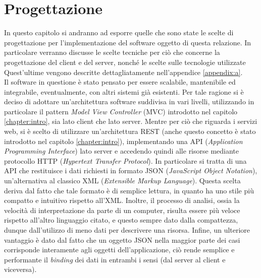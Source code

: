 \chapter{Progettazione} \label{chapter:prog}
In questo capitolo si andranno ad esporre quelle che sono state le scelte di progettazione per l'implementazione del software oggetto di questa relazione. In particolare verranno discusse le scelte tecniche per ciò che concerne la progettazione del client e del server, nonché le scelte sulle tecnologie utilizzate
Quest'ultime vengono descritte dettagliatamente nell'appendice \ref{appendix:a}.\\

Il software in questione è stato pensato per essere scalabile, mantenibile ed integrabile, eventualmente, con altri sistemi già esistenti. Per tale ragione si è deciso di adottare un'architettura software suddivisa in vari livelli, utilizzando in particolare il pattern \textit{Model View Controller} (MVC) introdotto nel capitolo \ref{chapter:intro}, sia lato client che lato server. Mentre per ciò che riguarda i servizi web, si è scelto di utilizzare un'architettura REST (anche questo concetto è stato introdotto nel capitolo \ref{chapter:intro}), implementando una API (\textit{Application Programming Interface}) lato server e accedendo quindi alle risorse mediante protocollo HTTP (\textit{Hypertext Transfer Protocol}). In particolare si tratta di una API che restituisce i dati richiesti in formato JSON (\textit{JavaScript Object Notation}), un'alternativa al classico XML (\textit{Extensible Markup Language}). Questa scelta deriva dal fatto che tale formato è di semplice lettura, in quanto ha uno stile più compatto e intuitivo rispetto all'XML. Inoltre, il processo di analisi, ossia la velocità di interpretazione da parte di un computer, risulta essere più veloce rispetto all'altro linguaggio citato, e questo sempre dato dalla compattezza, dunque dall'utilizzo di meno dati per descrivere una risorsa. Infine, un ulteriore vantaggio è dato dal fatto che un oggetto JSON nella maggior parte dei casi corrisponde interamente agli oggetti dell'applicazione, ciò rende semplice e performante il \textit{binding} dei dati in entrambi i sensi (dal server al client e viceversa).  

